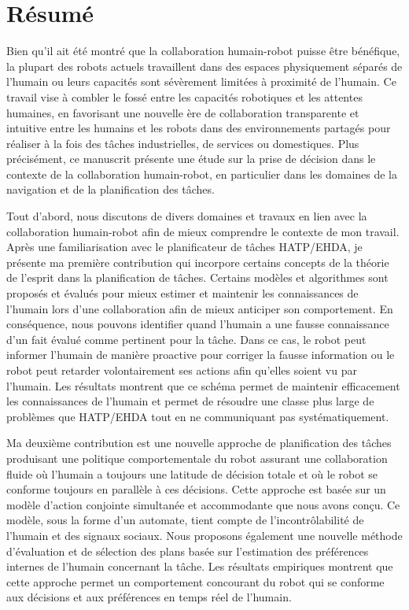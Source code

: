 \chapter*{Résumé}

Bien qu'il ait été montré que la collaboration humain-robot puisse être bénéfique, la plupart des robots actuels travaillent dans des espaces physiquement séparés de l'humain ou leurs capacités sont sévèrement limitées à proximité de l'humain. Ce travail vise à combler le fossé entre les capacités robotiques et les attentes humaines, en favorisant une nouvelle ère de collaboration transparente et intuitive entre les humains et les robots dans des environnements partagés pour réaliser à la fois des tâches industrielles, de services ou domestiques. Plus précisément, ce manuscrit présente une étude sur la prise de décision dans le contexte de la collaboration humain-robot, en particulier dans les domaines de la navigation et de la planification des tâches.

Tout d'abord, nous discutons de divers domaines et travaux en lien avec la collaboration humain-robot afin de mieux comprendre le contexte de mon travail. Après une familiarisation avec le planificateur de tâches HATP/EHDA, je présente ma première contribution qui incorpore certains concepts de la théorie de l'esprit dans la planification de tâches. Certains modèles et algorithmes sont proposés et évalués pour mieux estimer et maintenir les connaissances de l'humain lors d'une collaboration afin de mieux anticiper son comportement. En conséquence, nous pouvons identifier quand l'humain a une fausse connaissance d'un fait évalué comme pertinent pour la tâche. Dans ce cas, le robot peut informer l'humain de manière proactive pour corriger la fausse information ou le robot peut retarder volontairement ses actions afin qu'elles soient vu par l'humain. Les résultats montrent que ce schéma permet de maintenir efficacement les connaissances de l'humain et permet de résoudre une classe plus large de problèmes que HATP/EHDA tout en ne communiquant pas systématiquement.

Ma deuxième contribution est une nouvelle approche de planification des tâches produisant une politique comportementale du robot assurant une collaboration fluide où l'humain a toujours une latitude de décision totale et où le robot se conforme toujours en parallèle à ces décisions. Cette approche est basée sur un modèle d'action conjointe simultanée et accommodante que nous avons conçu. Ce modèle, sous la forme d'un automate, tient compte de l'incontrôlabilité de l'humain et des signaux sociaux. Nous proposons également une nouvelle méthode d'évaluation et de sélection des plans basée sur l'estimation des préférences internes de l'humain concernant la tâche. Les résultats empiriques montrent que cette approche permet un comportement concourant du robot qui se conforme aux décisions et aux préférences en temps réel de l'humain.

